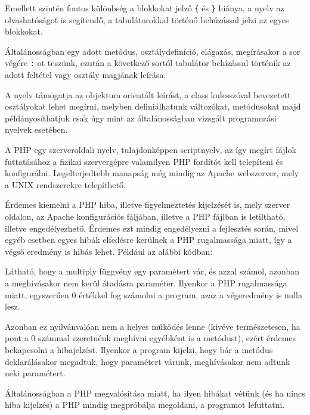 Emellett szintén fontos különbség a blokkokat jelző \texttt{\{} és \texttt{\}} hiánya, a nyelv az olvashatóságot is segítendő, a tabulátorokkal történő behúzással jelzi az egyes blokkokat.

Általánosságban egy adott metódus, osztálydefiníció, elágazás, megírásakor a sor végére \texttt{:}-ot teszünk, ezután a következő sortól tabulátor behízással történik az adott feltétel vagy osztály magjának leírása.

A nyelv támogatja az objektum orientált leírást, a class kulcsszóval bevezetett osztályokat lehet megírni, melyben definiálhatunk változókat, metódusokat majd példányosíthatjuk csak úgy mint az általánosságban vizsgált programozási nyelvek esetében.

A PHP egy szerveroldali nyelv, tulajdonképpen scriptnyelv, az így megírt fájlok futtatásához a fizikai szervergépre valamilyen PHP fordítót kell telepíteni és konfigurálni. Legelterjedtebb manapság még mindig az Apache webszerver, mely a UNIX rendszerekre telepíthető.

Érdemes kiemelni a PHP hiba, illetve figyelmeztetés kijelzését is, mely szerver oldalon, az Apache konfigurációs fáljában, illetve a PHP fájlban is letiltható, illetve engedélyezhető. Érdemes ezt mindig engedélyezni a fejlesztés során, mivel egyéb esetben egyes hibák elfedésre kerülnek a PHP rugalmassága miatt, így a végső eredmény is hibás lehet. Például az alábbi kódban:


Látható, hogy a multiply függvény egy paramétert vár, és azzal számol, azonban a meghívásakor nem kerül átadásra paraméter. Ilyenkor a PHP rugalmassága miatt, egyszerűen 0 értékkel fog számolni a program, azaz a végeredmény is nulla lesz.

Azonban ez nyilvánvalóan nem a helyes működés lenne (kivéve természetesen, ha pont a 0 számmal szeretnénk meghívni egyébként is a metódust), ezért érdemes bekapcsolni a hibajelzést. Ilyenkor a program kijelzi, hogy bár a metódus deklarálásakor megadtuk, hogy paramétert várunk, meghívásakor nem adtunk neki paramétert.

Általánosságban a PHP megvalósítása miatt, ha ilyen hibákat vétünk (és ha nincs hiba kijelzés) a PHP mindig megpróbálja megoldani, a programot lefuttatni.

